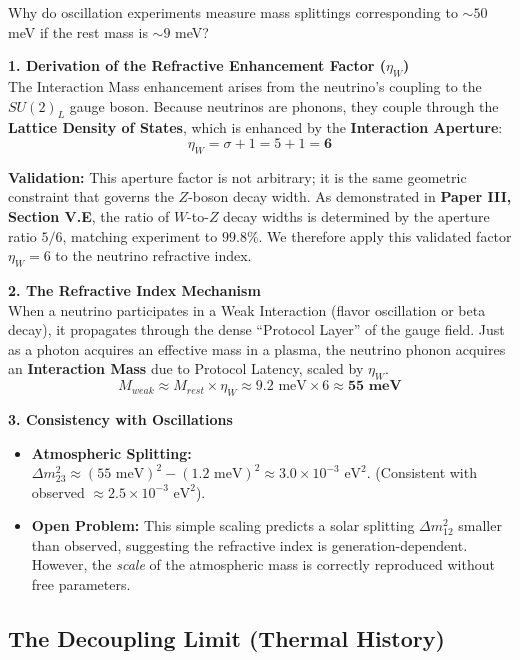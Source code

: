 Why do oscillation experiments measure mass splittings corresponding to $\sim 50$ meV if the rest mass is $\sim 9$ meV?

\textbf{1. Derivation of the Refractive Enhancement Factor ($\eta_W$)} \\
The Interaction Mass enhancement arises from the neutrino's coupling to the $SU(2)_L$ gauge boson. Because neutrinos are phonons, they couple through the \textbf{Lattice Density of States}, which is enhanced by the \textbf{Interaction Aperture}:
\begin{equation}
    \eta_W = \sigma + 1 = 5 + 1 = \mathbf{6}
\end{equation}

\textbf{Validation:} This aperture factor is not arbitrary; it is the same geometric constraint that governs the $Z$-boson decay width. As demonstrated in \textbf{Paper III, Section V.E}, the ratio of $W$-to-$Z$ decay widths is determined by the aperture ratio $5/6$, matching experiment to $99.8\%$. We therefore apply this validated factor $\eta_W=6$ to the neutrino refractive index.

\textbf{2. The Refractive Index Mechanism} \\
When a neutrino participates in a Weak Interaction (flavor oscillation or beta decay), it propagates through the dense ``Protocol Layer'' of the gauge field. Just as a photon acquires an effective mass in a plasma, the neutrino phonon acquires an \textbf{Interaction Mass} due to Protocol Latency, scaled by $\eta_W$.
\begin{equation}
    M_{weak} \approx M_{rest} \times \eta_W \approx 9.2 \text{ meV} \times 6 \approx \mathbf{55 \text{ meV}}
\end{equation}

\textbf{3. Consistency with Oscillations}
\begin{itemize}
    \item \textbf{Atmospheric Splitting:} $\Delta m^2_{23} \approx (55 \text{ meV})^2 - (1.2 \text{ meV})^2 \approx 3.0 \times 10^{-3} \text{ eV}^2$. (Consistent with observed $\approx 2.5 \times 10^{-3} \text{ eV}^2$).
    \item \textbf{Open Problem:} This simple scaling predicts a solar splitting $\Delta m^2_{12}$ smaller than observed, suggesting the refractive index is generation-dependent. However, the \textit{scale} of the atmospheric mass is correctly reproduced without free parameters.
\end{itemize}

\subsection{The Decoupling Limit (Thermal History)}

